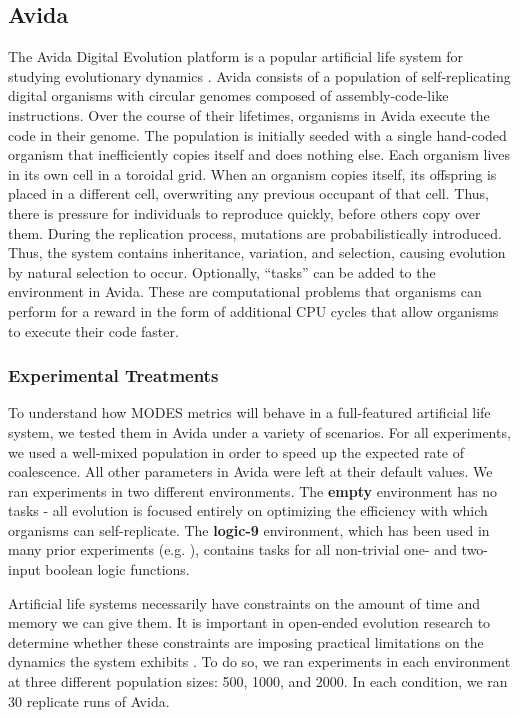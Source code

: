 \documentclass[letterpaper]{article}
\begin{document}
\subsection{Avida}

The Avida Digital Evolution platform is a popular artificial life system for studying evolutionary dynamics \citep{ofria_avida:_2004}. Avida consists of a population of self-replicating digital organisms with circular genomes composed of assembly-code-like instructions. Over the course of their lifetimes, organisms in Avida execute the code in their genome. The population is initially seeded with a single hand-coded organism that inefficiently copies itself and does nothing else. Each organism lives in its own cell in a toroidal grid. When an organism copies itself, its offspring is placed in a different cell, overwriting any previous occupant of that cell. Thus, there is pressure for individuals to reproduce quickly, before others copy over them. During the replication process, mutations are probabilistically introduced. Thus, the system contains inheritance, variation, and selection, causing evolution by natural selection to occur. Optionally, ``tasks'' can be added to the environment in Avida. These are computational problems that organisms can perform for a reward in the form of additional CPU cycles that allow organisms to execute their code faster.

\subsubsection{Experimental Treatments}
To understand how MODES metrics will behave in a full-featured artificial life system, we tested them in Avida under a variety of scenarios. For all experiments, we used a well-mixed population in order to speed up the expected rate of coalescence. All other parameters in Avida were left at their default values. We ran experiments in two different environments. The \textbf{empty} environment has no tasks - all evolution is focused entirely on optimizing the efficiency with which organisms can self-replicate. The \textbf{logic-9} environment, which has been used in many prior experiments (e.g. \citep{lenski_evolutionary_2003}), contains tasks for all non-trivial one- and two-input boolean logic functions.

Artificial life systems necessarily have constraints on the amount of time and memory we can give them. It is important in open-ended evolution research to determine whether these constraints are imposing practical limitations on the dynamics the system exhibits \citep{zaman_investigating_2018}. To do so, we ran experiments in each environment at three different population sizes: 500, 1000, and 2000. In each condition, we ran 30 replicate runs of Avida.
\end{document}
